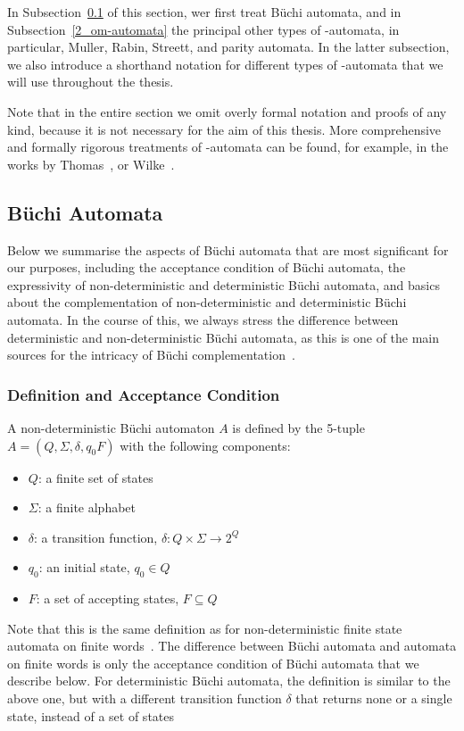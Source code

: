 In Subsection~\ref{2_buchi_automata} of this section, wer first treat Büchi automata, and in Subsection~\ref{2_om-automata} the principal other types of \om-automata, in particular, Muller, Rabin, Streett, and parity automata. In the latter subsection, we also introduce a shorthand notation for different types of \om-automata that we will use throughout the thesis.

Note that in the entire section we omit overly formal notation and proofs of any kind, because it is not necessary for the aim of this thesis. More comprehensive and formally rigorous treatments of \om-automata can be found, for example, in the works by Thomas~\cite{Thomas:1991,1996_thomas}, or Wilke~\cite{2014_wilke}.

\subsection{Büchi Automata}
\label{2_buchi_automata}
Below we summarise the aspects of Büchi automata that are most significant for our purposes, including the acceptance condition of Büchi automata, the expressivity of non-deterministic and deterministic Büchi automata, and basics about the complementation of non-deterministic and deterministic Büchi automata. In the course of this, we always stress the difference between deterministic and non-deterministic Büchi automata, as this is one of the main sources for the intricacy of Büchi complementation~\cite{niessner1997deterministic}.  

\subsubsection{Definition and Acceptance Condition}
A non-deterministic Büchi automaton $A$  is defined by the 5-tuple $A = (Q, \Sigma, \delta, q_0 F)$ with the following components:
\begin{itemize}
\item $Q$: a finite set of states
\item $\Sigma$: a finite alphabet
\item $\delta$: a transition function, $\delta: Q \times \Sigma \rightarrow 2^Q$
\item $q_0$: an initial state, $q_0 \in Q$
\item $F$: a set of accepting states, $F \subseteq Q$
\end{itemize}

Note that this is the same definition as for non-deterministic finite state automata on finite words~\cite{hopcroft2006automata}. The difference between Büchi automata and automata on finite words is only the acceptance condition of Büchi automata that we describe below. For deterministic Büchi automata, the definition is similar to the above one, but with a different transition function $\delta$ that returns none or a single state, instead of a set of states

